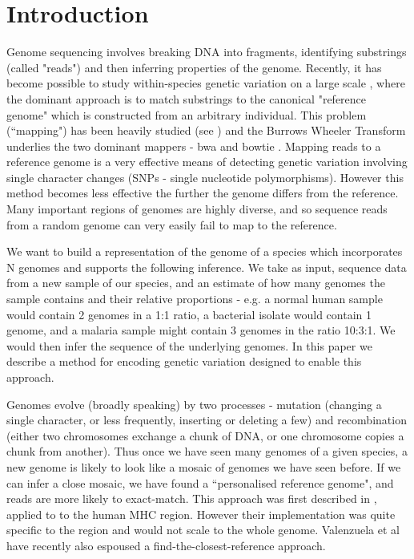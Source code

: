 \documentclass[runningheads,a4paper]{llncs}
\begin{document}
\section{Introduction}

Genome sequencing involves breaking  DNA into fragments, identifying substrings (called "reads") and then inferring properties of the genome. Recently, it has become possible to study within-species genetic variation on a large scale \cite{1000g,arabi,pombe}, where the dominant approach is to match substrings to the canonical "reference genome" which is constructed from an arbitrary individual.  This problem (``mapping") has been heavily studied  (see \cite{reinert}) and the Burrows Wheeler Transform \cite{bwt} underlies the two dominant mappers - bwa \cite{bwa} and bowtie \cite{bowtie}. Mapping reads to a reference genome is a very effective means of detecting genetic variation involving single character changes (SNPs - single nucleotide polymorphisms). However this method becomes less effective the further the genome differs from the reference.  Many important regions of genomes are highly diverse, and so sequence reads from a random genome can very easily fail to map to the reference. 

We  want to build a representation of the genome of a species which incorporates N genomes and supports the following inference. We take as input, sequence data from a new sample of our species, and  an estimate of how many genomes the sample contains and their relative proportions - e.g. a normal human sample would contain 2 genomes in a 1:1 ratio, a bacterial isolate would contain 1 genome, and a malaria sample might contain 3 genomes in the ratio 10:3:1. We would then infer the sequence of the underlying genomes. In this paper we describe a method for encoding genetic variation designed to enable this approach. 

Genomes evolve (broadly speaking) by two processes - mutation (changing a single character, or less frequently, inserting or deleting a few) and recombination (either two chromosomes exchange a chunk of DNA, or one chromosome copies a chunk from another). Thus once we have seen many genomes of a given species, a new genome is likely to look like a mosaic of genomes we have seen before.  If we can infer a close mosaic, we have found a ``personalised reference genome", and reads are more likely to exact-match. This approach was first described in \cite{dilthey}, applied to to the human MHC region. However their implementation was quite specific to the region and would not scale to the whole genome. Valenzuela et al \cite{valen} have recently also espoused a find-the-closest-reference approach.
\end{document}
